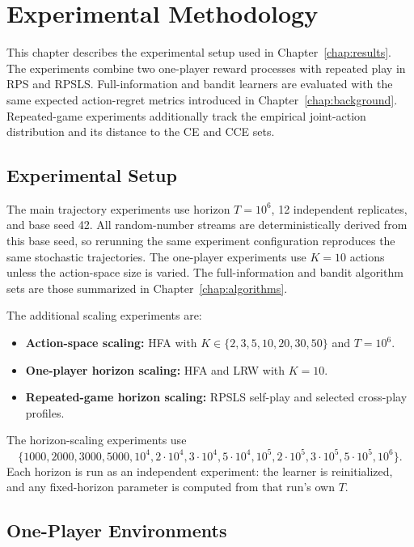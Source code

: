 
\chapter{Experimental Methodology}
\label{chap:methodology}

This chapter describes the experimental setup used in
Chapter~\ref{chap:results}. The experiments combine two one-player reward
processes with repeated play in RPS and RPSLS. Full-information and bandit
learners are evaluated with the same expected action-regret metrics introduced
in Chapter~\ref{chap:background}. Repeated-game experiments additionally track
the empirical joint-action distribution and its distance to the CE and CCE
sets.

\section{Experimental Setup}
\label{sec:experimental-design}

The main trajectory experiments use horizon \(T=10^6\), 12 independent
replicates, and base seed 42. All random-number streams are deterministically
derived from this base seed, so rerunning the same experiment configuration
reproduces the same stochastic trajectories. The one-player experiments use
\(K=10\) actions unless the action-space size is varied. The full-information
and bandit algorithm sets are those summarized in
Chapter~\ref{chap:algorithms}.

The additional scaling experiments are:

\begin{itemize}
    \item \textbf{Action-space scaling:} HFA with
    \(K\in\{2,3,5,10,20,30,50\}\) and \(T=10^6\).
    \item \textbf{One-player horizon scaling:} HFA and LRW with \(K=10\).
    \item \textbf{Repeated-game horizon scaling:} RPSLS self-play and selected
    cross-play profiles.
\end{itemize}

The horizon-scaling experiments use
\[
\{1000,2000,3000,5000,10^4,2\!\cdot\!10^4,3\!\cdot\!10^4,
5\!\cdot\!10^4,10^5,2\!\cdot\!10^5,3\!\cdot\!10^5,
5\!\cdot\!10^5,10^6\}.
\]
Each horizon is run as an independent experiment: the learner is reinitialized,
and any fixed-horizon parameter is computed from that run's own \(T\).

\section{One-Player Environments}
\label{sec:experimental-environments}

